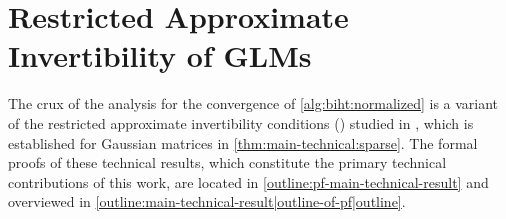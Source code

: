 \section{Restricted Approximate Invertibility of GLMs}
\label{outline:main-technical-result}

The crux of the analysis for the convergence of \ALGORITHM \ref{alg:biht:normalized} is a variant of the restricted approximate invertibility conditions (\RAICs) studied in \cite{friedlander2021nbiht,matsumoto2022binary}, which is established for Gaussian matrices in \THEOREM \ref{thm:main-technical:sparse}.
The formal proofs of these technical results, which constitute the primary technical contributions of this work, are located in \APPENDIX \ref{outline:pf-main-technical-result} and overviewed in \SECTION \ref{outline:main-technical-result|outline-of-pf|outline}.



%

%

